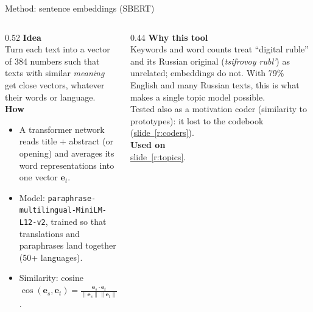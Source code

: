 \documentclass[aspectratio=169,10pt]{beamer}
\newcommand{\usedon}[1]{\hyperref[#1]{\textcolor{c4}{slide~\ref*{#1}}}}
\newcommand{\mhead}[1]{\textcolor{c1}{\textbf{#1}}\\[1pt]}
\begin{document}
\begin{frame}{Method: sentence embeddings (SBERT)}
\begin{columns}[T]
\begin{column}{0.52\textwidth}\footnotesize
\mhead{Idea}
Turn each text into a vector of 384 numbers such that texts with similar \emph{meaning} get close vectors, whatever their words or language.\\[4pt]
\mhead{How}
\begin{itemize}\setlength\itemsep{1pt}
\item A transformer network reads title + abstract (or opening) and averages its word representations into one vector $\mathbf{e}_t$.
\item Model: \texttt{paraphrase-multilingual-MiniLM-L12-v2}, trained so that translations and paraphrases land together (50+ languages).
\item Similarity: cosine $\cos(\mathbf{e}_s,\mathbf{e}_t) = \frac{\mathbf{e}_s\cdot\mathbf{e}_t}{\|\mathbf{e}_s\|\|\mathbf{e}_t\|}$.
\end{itemize}
\end{column}
\begin{column}{0.44\textwidth}\footnotesize
\mhead{Why this tool}
Keywords and word counts treat ``digital ruble'' and its Russian original (\emph{tsifrovoy rubl'}) as unrelated; embeddings do not. With 79\% English and many Russian texts, this is what makes a single topic model possible.\\[3pt]
Tested also as a motivation coder (similarity to prototypes): it lost to the codebook (\usedon{r:coders}).\\[6pt]
\mhead{Used on}
\usedon{r:topics}.
\end{column}
\end{columns}
\end{frame}
\end{document}

